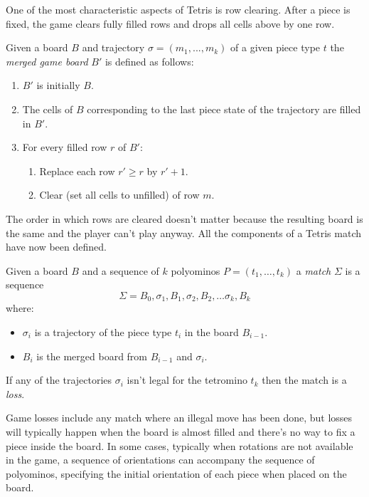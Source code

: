 One of the most characteristic aspects of Tetris is row clearing. After a piece is fixed, the game clears fully filled rows and drops all cells above by one row.  

\begin{definition}
  Given a board $B$ and trajectory $\sigma = (m_1, ..., m_k)$ of a given piece type $t$ the \emph{merged game board} $B'$ is defined as follows:
  \begin{enumerate}
    \item $B'$ is initially $B$.
    \item The cells of $B$ corresponding to the last piece state of the trajectory are filled in $B'$.
    \item For every filled row $r$ of $B'$:
      \begin{enumerate}
        \item Replace each row $r' \geq r$ by $r'+1$.
        \item Clear (set all cells to unfilled) of row $m$.
      \end{enumerate}
  \end{enumerate}
\end{definition}

The order in which rows are cleared doesn't matter because the resulting board is the same and the player can't play anyway. All the components of a Tetris match have now been defined.

\begin{definition}  
  Given a board $B$ and a sequence of $k$ polyominos $P = (t_1,\dots,t_k)$ a \emph{match} $\Sigma$ is a sequence
  $$ \Sigma = B_0, \sigma_1, B_1, \sigma_2, B_2, \dots  \sigma_k, B_k$$ 
  where:
  \begin{itemize}
    \item $\sigma_i$ is a trajectory of the piece type $t_i$ in the board $B_{i-1}$.
    \item $B_{i}$ is the merged board from $B_{i-1}$ and $\sigma_i$.
  \end{itemize}
  If any of the trajectories $\sigma_i$ isn't legal for the tetromino $t_k$ then the match is a \emph{loss}.
\end{definition}

Game losses include any match where an illegal move has been done, but losses will typically happen when the board is almost filled and there's no way to fix a piece inside the board. In some cases, typically when rotations are not available in the game, a sequence of orientations can accompany the sequence of polyominos, specifying the initial orientation of each piece when placed on the board.


